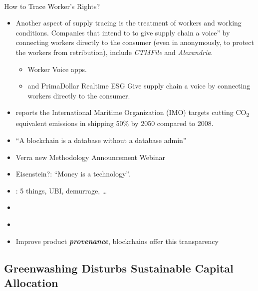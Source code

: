 \documentclass[
  letterpaper,
  DIV=11,
  numbers=noendperiod]{scrartcl}
\makeatletter
\let\oldparagraph\paragraph
\renewcommand{\paragraph}{
    \@ifstar
      \xxxParagraphStar
      \xxxParagraphNoStar
  }
\newcommand{\xxxParagraphStar}[1]{\oldparagraph*{#1}\mbox{}}
\newcommand{\xxxParagraphNoStar}[1]{\oldparagraph{#1}\mbox{}}
\providecommand{\tightlist}{%
  \setlength{\itemsep}{0pt}\setlength{\parskip}{0pt}}\usepackage{longtable,booktabs,array}
\makeatother
\begin{document}
\paragraph{How to Trace Worker's
Rights?}\label{how-to-trace-workers-rights}

\begin{itemize}
\tightlist
\item
  Another aspect of supply tracing is the treatment of workers and
  working conditions. Companies that intend to to give supply chain a
  voice'' by connecting workers directly to the consumer (even in
  anonymously, to protect the workers from retribution), include
  \emph{CTMFile} and \emph{Alexandria}.

  \begin{itemize}
  \tightlist
  \item
    \citet{WorkerVoice2022} Worker Voice apps.
  \item
    \citet{timnicolleRealtimeESGData2021} and
    \citet{primadollarmediaPrimaDollarGivingSupply2021} PrimaDollar
    Realtime ESG Give supply chain a voice by connecting workers
    directly to the consumer.
  \end{itemize}
\item
  \citet{matthewgoreEmissionsRegulationsShipping2022} reports the
  International Maritime Organization (IMO) targets cutting
  CO\textsubscript{2} equivalent emissions in shipping 50\% by 2050
  compared to 2008.
\item
  \citet{sepandarkamvarSepKamvarCelo2022} ``A blockchain is a database
  without a database admin''
\item
  \citet{verraVerraReleasesRevised2023} Verra new Methodology
  Announcement Webinar
\item
  Eisenstein?: ``Money is a technology''.
\item
  \citet{eisensteinSacredEconomicsMoney2011}: 5 things, UBI, demurrage,
  \ldots{}
\item
  \citet{BlockchainCompaniesTeam2021}
\item
  \citet{ganuWhyBlockchainCan2021}
\item
  Improve product \textbf{\emph{provenance}}, blockchains offer this
  transparency
\end{itemize}

\subsection{Greenwashing Disturbs Sustainable Capital
Allocation}\label{greenwashing-disturbs-sustainable-capital-allocation}
\end{document}
